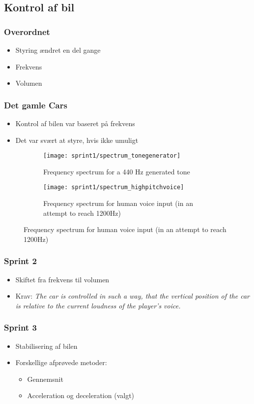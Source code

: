 \subsection{Kontrol af bil}
\begin{frame}
\frametitle{Overordnet}
\begin{itemize}
\item Styring ændret en del gange
\item Frekvens
\item Volumen
\end{itemize}
\end{frame}

\begin{frame}
\frametitle{Det gamle Cars}
\begin{itemize}
\item Kontrol af bilen var baseret på frekvens
\item Det var svært at styre, hvis ikke umuligt
\end{itemize}
\begin{figure}[h]
\centering
\begin{subfigure}[t]{.45\textwidth}
\texttt{[image: sprint1/spectrum\_tonegenerator]}
\caption*{Frequency spectrum for a 440 Hz generated tone}
\end{subfigure}
\begin{subfigure}[t]{.45\textwidth}
\texttt{[image: sprint1/spectrum\_highpitchvoice]}
\caption*{Frequency spectrum for human voice input (in an attempt to reach 1200Hz)}
\end{subfigure}
\end{figure}
\end{frame}

\begin{frame}
\frametitle{Sprint 2}
\begin{itemize}
\item Skiftet fra frekvens til volumen
\item Krav: \textit{The car is controlled in such a way,
that the vertical position of the car is relative
to the current loudness of the player's voice.}
\end{itemize}
\begin{figure}
\centering

\end{figure}
\end{frame}

\begin{frame}
\frametitle{Sprint 3}
\begin{itemize}
\item Stabilisering af bilen
\item Forskellige afprøvede metoder:
\begin{itemize}
\item Gennemsnit
\item Acceleration og deceleration (valgt)
\end{itemize}
\end{itemize}
\end{frame}


